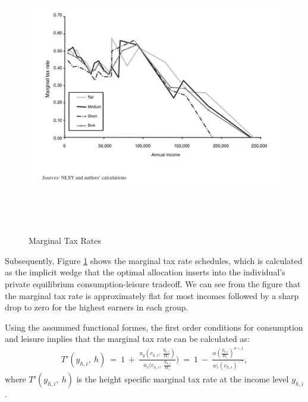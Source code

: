 \documentclass[titlepage]{\econtex}
\begin{document}
\begin{figure}[H]
  \centering
  \includegraphics[width=1\textwidth, height=12cm]{MarginalTax.JPG}
  \caption{Marginal Tax Rates}
    \label{fig:Figure 3}
  \end{figure} 

  Subsequently, Figure \ref{fig:Figure 3} shows the marginal tax rate schedules, which is calculated as the implicit wedge that the optimal allocation inserts into the individual's private equilibrium consumption-leisure tradeoff. We can see from the figure that the marginal tax rate is approximately flat for most incomes followed by a sharp drop to zero for the highest earners in each group.

  Using the assummed functional formes, the first order conditions for consumption and leisure implies that the marginal tax rate can be calculated as:
\begin{align}
  T'(y_{h,i}, \ h) \ = \ 1 \ + \ \frac{u_y(c_{h,i}, \ \frac{y_{h,i}}{W_i})}{u_c(c_{h,i}, \ \frac{y_{h,i}}{W_i}}) \ = \ 1 \ - \ \frac{\alpha(\frac{y_{h,i}}{W_i})^{\sigma-1}}{w_i(c_{h,i})^{-\gamma}},
\end{align}
where $T'(y_{h,i}, \ h)$ is the height specific marginal tax rate at the income level $y_{h,i}$.
  
\end{document}
